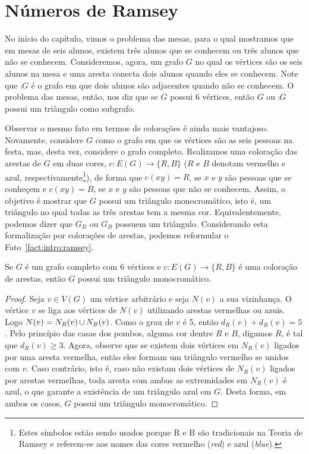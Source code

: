 
\section{Números de Ramsey}

No início do capítulo, vimos o problema das mesas, para o qual mostramos que em mesas de seis alunos, existem três alunos que se conhecem ou três alunos que não se conhecem. Consideremos, agora, um grafo $G$ no qual os vértices são os seis alunos na mesa e uma aresta conecta dois alunos quando eles se conhecem. Note que $\comp{G}$ é o grafo em que dois alunos são adjacentes quando não se conhecem. O problema das mesas, então, nos diz que se $G$ possui 6 vértices, então $G$ ou $\comp{G}$ possui um triângulo como subgrafo.

Observar o mesmo fato em termos de colorações é ainda mais vantajoso. Novamente, considere $G$ como o grafo em que os vértices são as seis pessoas na festa, mas, desta vez, considere o grafo completo. Realizamos uma coloração das arestas de $G$ em duas cores, $c: E(G) \to \{ R,B \}$ ($R$ e $B$ denotam vermelho e azul, respectivamente\footnote{Estes símbolos estão sendo usados porque R e B são tradicionais na Teoria de Ramsey e referem-se aos nomes das cores vermelho (\emph{red}) e azul (\emph{blue}).}), de forma que $c(xy) = R$, se $x$ e $y$ são pessoas que se conheçem e $c(xy) = B$, se $x$ e $y$ são pessoas que não se conhecem.
Assim, o objetivo é mostrar que $G$ possui um triângulo monocromático, isto é, um triângulo no qual todas as três arestas tem a mesma cor. Equivalentemente, podemos dizer que $G_R$ ou $G_B$ possuem um triângulo. Considerando esta formalização por colorações de arestas, podemos reformular o Fato~\ref{fact:intro:ramsey}.

\begin{proposition}
\label{thm:intro:r33}
Se $G$ é um grafo completo com 6 vértices e $c: E(G) \to \{ R,B\}$ é uma coloração de arestas, então $G$ possui um triângulo monocromático.
\end{proposition}
\begin{proof}
Seja $v \in V(G)$ um vértice arbitrário e seja $N(v)$ a sua vizinhança. O vértice $v$ se liga aos vértices de $N(v)$ utilizando arestas vermelhas ou azuis. Logo $N(v) = N_R(v) \operatorname{\cup} N_B(v)$. Como o grau de $v$ é 5, então $d_R(v) + d_B(v) = 5$. Pelo princípio das casas dos pombos, alguma cor dentre $R$ e $B$, digamos $R$, é tal que $d_R(v) \geq 3$. Agora, observe que se existem dois vértices em $N_R(v)$ ligados por uma aresta vermelha, então eles formam um triângulo vermelho se unidos com $v$. Caso contrário, isto é, caso não existam dois vértices de $N_R(v)$ ligados por arestas vermelhas, toda aresta com ambas as extremidades em $N_R(v)$ é azul, o que garante a existência de um triângulo azul em $G$. Desta forma, em ambos os casos, $G$ possui um triângulo monocromático.
\end{proof}

